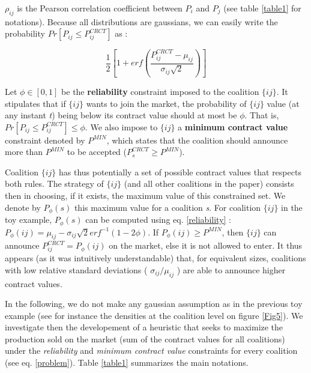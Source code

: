 \documentclass[conference]{IEEEtran}
\begin{document}
$ \rho_{ij} $ is the Pearson correlation coefficient between $ P_{i} $ and $ P_{j} $ (see table \ref{table1} for notations). Because all distributions are gaussians, we can easily write the probability $ Pr[P_{ij} \leq P_{ij}^{CRCT} ] $ as :

\begin{equation}
\dfrac{1}{2} \left[ 1+ erf \left( \dfrac{P_{ij}^{CRCT} - \mu_{ij}}{\sigma_{ij}\sqrt{2}} \right) \right]
\label{reliability}
\end{equation}

Let $ \phi \in [0,1] $ be the \textbf{reliability} constraint imposed to the coalition $\{ij\} $. It stipulates that if $\{ij\} $ wants to join the market, the probability of $\{ij\} $ value (at any instant \textit{t}) being below its contract value should at most be $ \phi $. That is, $ Pr[P_{ij} \leq P_{ij}^{CRCT} ] \leq \phi $. We also impose to $ \{ij\} $ a \textbf{minimum contract value} constraint denoted by $ P^{MIN} $, which states that the coalition should announce more than $ P^{MIN} $ to be accepted ($ P_{s}^{CRCT} \geq P^{MIN} $).

Coalition $ \{ij\} $ has thus potentially a set of possible contract values that respects both rules. The strategy of $ \{ij\} $ (and all other coalitions in the paper) consists then in choosing, if it exists, the maximum value of this constrained set. We denote by $ P_{\phi}(s) $ this maximum value for a coalition \textit{s}. For coalition $ \{ij\} $ in the toy example, $ P_{\phi}(s) $ can be computed using eq. \ref{reliability} : $ P_{\phi}(ij) = \mu_{ij} - \sigma_{ij}\sqrt{2}erf^{-1}(1-2 \phi ) $. If  $ P_{\phi}(ij) \geq P^{MIN} $, then $ \{ij\} $ can announce $ P_{ij}^{CRCT} = P_{\phi}(ij)$ on the market, else it is not allowed to enter. It thus appears (as it was intuitively understandable) that, for equivalent sizes, coalitions with low relative standard deviations ( $ \sigma_{ij} / \mu_{ij} $ ) are able to announce higher contract values. 


In the following, we do not make any gaussian assumption as in the previous toy example (see for instance the densities at the coalition level on figure \ref{Fig5}). We investigate then the developement of a heuristic that seeks to maximize the production sold on the market (sum of the contract values for all coalitions) under the \textit{reliability} and \textit{minimum contract value} constraints for every coalition (see eq. \ref{problem}). Table \ref{table1} summarizes the main notations.
\end{document}
